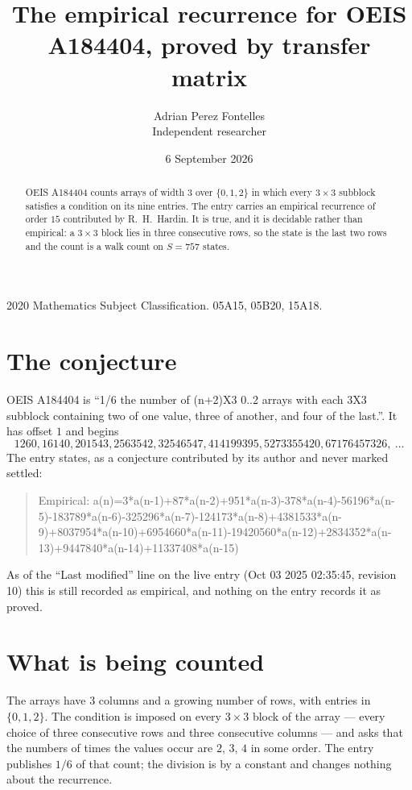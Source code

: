 \documentclass[11pt,a4paper]{article}
\title{The empirical recurrence for OEIS A184404, proved by transfer matrix}
\author{Adrian Perez Fontelles\\ \small Independent researcher}
\date{6 September 2026}
\theoremstyle{plain}
\theoremstyle{definition}
\begin{document}
\maketitle

\begin{abstract}
OEIS A184404 counts arrays of width $3$ over $\{0,1,2\}$ in which every $3\times3$ subblock
satisfies a condition on its nine entries. The entry carries an empirical recurrence of order
$15$ contributed by R.~H.~Hardin. It is true, and it is decidable rather than empirical: a
$3\times3$ block lies in three consecutive rows, so the state is the last two rows and the
count is a walk count on $S=757$ states.
\end{abstract}

\noindent\small 2020 Mathematics Subject Classification. 05A15, 05B20, 15A18.\normalsize

\section{The conjecture}

OEIS A184404 is ``1/6 the number of (n+2)X3 0..2 arrays with each 3X3 subblock containing two of one value, three of another, and four of the last.''. It has offset $1$ and begins
\[
1260, 16140, 201543, 2563542, 32546547, 414199395, 5273355420, 67176457326,\ \dots
\]
The entry states, as a conjecture contributed by its author and never marked settled:
\begin{quote}
Empirical: a(n)=3*a(n-1)+87*a(n-2)+951*a(n-3)-378*a(n-4)-56196*a(n-5)-183789*a(n-6)-325296*a(n-7)-124173*a(n-8)+4381533*a(n-9)+8037954*a(n-10)+6954660*a(n-11)-19420560*a(n-12)+2834352*a(n-13)+9447840*a(n-14)+11337408*a(n-15)
\end{quote}
As of the ``Last modified'' line on the live entry (Oct 03 2025 02:35:45, revision 10) this is still
recorded as empirical, and nothing on the entry records it as proved.

\section{What is being counted}

The arrays have $3$ columns and a growing number of rows, with entries in $\{0,1,2\}$. The
condition is imposed on every $3\times3$ block of the array --- every choice of three
consecutive rows and three consecutive columns --- and asks that the numbers of times the values occur are $2,\,3,\,4$ in some order. The entry publishes $1/6$ of that count; the division is by a constant and changes nothing about the recurrence.
\end{document}
